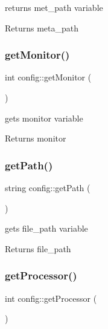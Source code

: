 returns met\+\_\+path variable 

\begin{DoxyReturn}{Returns}
meta\+\_\+path 
\end{DoxyReturn}
\mbox{\label{classconfig_a8d6bac5f06d23f3cda348d8908384128}} 
\subsubsection{\texorpdfstring{getMonitor()}{getMonitor()}}
{\footnotesize\ttfamily int config\+::get\+Monitor (\begin{DoxyParamCaption}{ }\end{DoxyParamCaption})}



gets monitor variable 

\begin{DoxyReturn}{Returns}
monitor 
\end{DoxyReturn}
\mbox{\label{classconfig_a9c5684cef814969ee251614da14c5e9a}} 
\subsubsection{\texorpdfstring{getPath()}{getPath()}}
{\footnotesize\ttfamily string config\+::get\+Path (\begin{DoxyParamCaption}{ }\end{DoxyParamCaption})}



gets file\+\_\+path variable 

\begin{DoxyReturn}{Returns}
file\+\_\+path 
\end{DoxyReturn}
\mbox{\label{classconfig_a77cfd91eb08979cd773bc4b42e2f5c1c}} 
\subsubsection{\texorpdfstring{getProcessor()}{getProcessor()}}
{\footnotesize\ttfamily int config\+::get\+Processor (\begin{DoxyParamCaption}{ }\end{DoxyParamCaption})}



